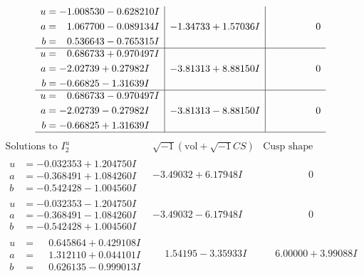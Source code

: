 \documentclass[1p]{elsarticle_modified}
\theoremstyle{definition}
\newcommand{\I}{\sqrt{-1}}
\begin{document}
$$\begin{array}{c|c|c}
\begin{aligned}
u &= -1.008530 - 0.628210 I \\
a &= \phantom{-}1.067700 - 0.089134 I \\
b &= \phantom{-}0.536643 - 0.765315 I\end{aligned}
 & -1.34733 + 1.57036 I & \phantom{-0.000000 } 0 \\ \hline\begin{aligned}
u &= \phantom{-}0.686733 + 0.970497 I \\
a &= -2.02739 + 0.27982 I \\
b &= -0.66825 - 1.31639 I\end{aligned}
 & -3.81313 + 8.88150 I & \phantom{-0.000000 } 0 \\ \hline\begin{aligned}
u &= \phantom{-}0.686733 - 0.970497 I \\
a &= -2.02739 - 0.27982 I \\
b &= -0.66825 + 1.31639 I\end{aligned}
 & -3.81313 - 8.88150 I & \phantom{-0.000000 } 0\\
 \hline 
 \end{array}$$\newpage$$\begin{array}{c|c|c}  
\text{Solutions to }I^u_{2}& \I (\text{vol} + \sqrt{-1}CS) & \text{Cusp shape}\\
 \hline 
\begin{aligned}
u &= -0.032353 + 1.204750 I \\
a &= -0.368491 + 1.084260 I \\
b &= -0.542428 - 1.004560 I\end{aligned}
 & -3.49032 + 6.17948 I & \phantom{-0.000000 } 0 \\ \hline\begin{aligned}
u &= -0.032353 - 1.204750 I \\
a &= -0.368491 - 1.084260 I \\
b &= -0.542428 + 1.004560 I\end{aligned}
 & -3.49032 - 6.17948 I & \phantom{-0.000000 } 0 \\ \hline\begin{aligned}
u &= \phantom{-}0.645864 + 0.429108 I \\
a &= \phantom{-}1.312110 + 0.044101 I \\
b &= \phantom{-}0.626135 - 0.999013 I\end{aligned}
 & \phantom{-}1.54195 - 3.35933 I & \phantom{-}6.00000 + 3.99088 I \\ \hline\begin{aligned}

\end{aligned}
\end{array}$$
\end{document}
